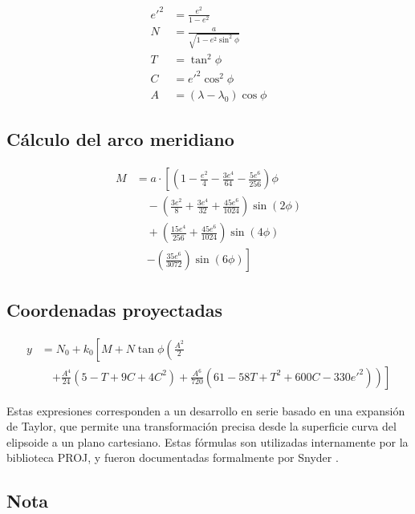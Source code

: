 \documentclass[12pt]{article}
\begin{document}
\begin{align*}
e'^2 &= \frac{e^2}{1 - e^2} \\
N &= \frac{a}{\sqrt{1 - e^2 \sin^2 \phi}} \\
T &= \tan^2 \phi \\
C &= e'^2 \cos^2 \phi \\
A &= (\lambda - \lambda_0) \cos \phi
\end{align*}

\subsection*{Cálculo del arco meridiano}

\begin{align*}
M &= a \cdot \left[
(1 - \frac{e^2}{4} - \frac{3e^4}{64} - \frac{5e^6}{256}) \phi \right. \\
&\quad - (\frac{3e^2}{8} + \frac{3e^4}{32} + \frac{45e^6}{1024}) \sin(2\phi) \\
&\quad + (\frac{15e^4}{256} + \frac{45e^6}{1024}) \sin(4\phi) \\
&\quad \left. - (\frac{35e^6}{3072}) \sin(6\phi)
\right]
\end{align*}

\subsection*{Coordenadas proyectadas}

\begin{equation}
\begin{split}
y &= N_0 + k_0 \left[ M + N \tan \phi \left( \frac{A^2}{2} \right.\right. \\
&\quad \left.\left. + \frac{A^4}{24}(5 - T + 9C + 4C^2) + \frac{A^6}{720}(61 - 58T + T^2 + 600C - 330e'^2) \right) \right]
\end{split}
\end{equation}

Estas expresiones corresponden a un desarrollo en serie basado en una expansión de Taylor, que permite una transformación precisa desde la superficie curva del elipsoide a un plano cartesiano. Estas fórmulas son utilizadas internamente por la biblioteca PROJ, y fueron documentadas formalmente por Snyder \parencite{snyder1987}.

\subsection*{Nota}
\end{document}
